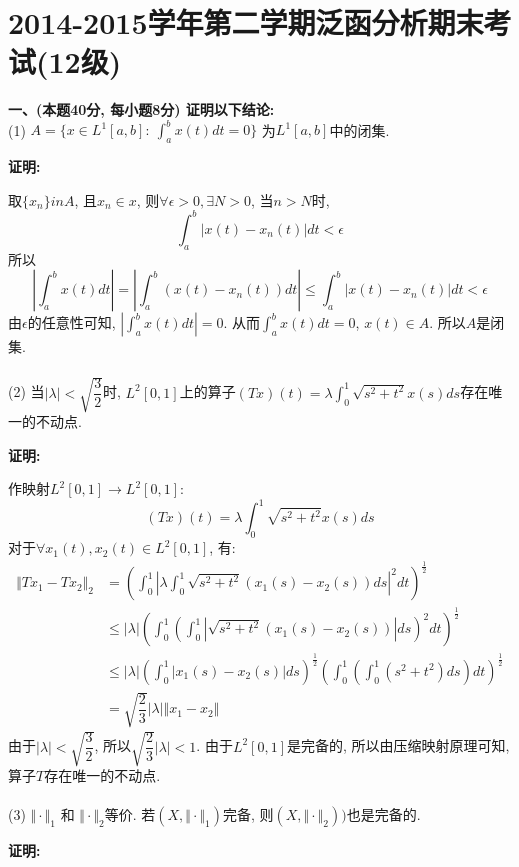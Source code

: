 \documentclass{article}
\begin{document}
\section{2014-2015学年第二学期泛函分析期末考试(12级)}
\textbf{一、(本题40分, 每小题8分) 证明以下结论:}  \\

(1) $A = \{ x \in L^1[a,b]: \ \int_a^b x(t) dt= 0 \}$ 为$L^1[a,b]$中的闭集. 

\textbf{证明:}

取$\{ x_n \} in A$, 且$x_n \in x$, 则$\forall \epsilon>0, \exists N>0$, 当$n>N$时,
$$ \int_a^b |x(t) - x_n(t)| dt < \epsilon $$
所以
$$ |\int_a^b x(t) dt| = |\int_a^b \left( x(t) - x_n(t) \right) dt| \leq \int_a^b |x(t) - x_n(t)|dt < \epsilon $$
由$\epsilon$的任意性可知, $|\int_a^b x(t)dt| = 0$. 从而$\int_a^b x(t)dt=0$, $x(t) \in A$. 所以$A$是闭集. \\  \\


(2) 当$|\lambda| < \sqrt{\dfrac{3}{2}}$时, $L^2[0,1]$上的算子$(Tx)(t) = \lambda \int_0^1 \sqrt{s^2 + t^2}x(s) ds$存在唯一的不动点. 

\textbf{证明:}

作映射$L^2[0,1] \rightarrow L^2[0,1]:$
$$ (Tx)(t) = \lambda \int_0^1 \sqrt{s^2+t^2} x(s)ds $$
对于$\forall x_1(t), x_2(t) \in L^2[0,1]$, 有:
\begin{align*}
\Vert Tx_1 - Tx_2 \Vert_2 &= \left(\int_0^1 \left| \lambda \int_0^1 \sqrt{s^2 + t^2}\left(x_1(s) - x_2(s) \right) ds   \right|^2 dt  \right)^\frac{1}{2} \\
  &\leq |\lambda|\left(\int_0^1 \left( \int_0^1 |\sqrt{s^2 + t^2}\left(x_1(s) - x_2(s) \right)|ds   \right)^2 dt  \right)^{\frac{1}{2}}  \\
  &\leq |\lambda|\left(\int_0^1 \left|x_1(s) - x_2(s)\right| ds\right)^{\frac{1}{2}}\left( \int_0^1\left( \int_0^1 (s^2 + t^2) ds \right)    dt\right)^{\frac{1}{2}} \\
  &= \sqrt{\dfrac{2}{3}}|\lambda| \Vert x_1 - x_2 \Vert
\end{align*}
由于$|\lambda|<\sqrt{\dfrac{3}{2}}$, 所以$\sqrt{\dfrac{2}{3}}|\lambda| <1$. 由于$L^2[0,1]$是完备的, 所以由压缩映射原理可知, 算子$T$存在唯一的不动点. \\  \\


(3) $\Vert \cdot \Vert_1$ 和 $\Vert \cdot \Vert_2$等价. 若$(X, \Vert \cdot \Vert_1)$完备, 则$(X, \Vert \cdot \Vert_2))$也是完备的. 

\textbf{证明:}
\end{document}
